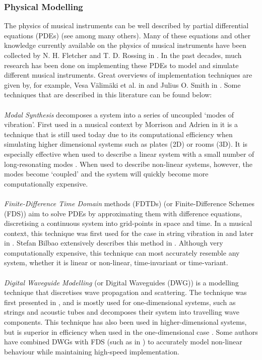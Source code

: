 \subsubsection*{Physical Modelling}
The physics of musical instruments can be well described by partial differential equations (PDEs) (see \cite{Bilbao2009} among many others). Many of these equations and other knowledge currently available on the physics of musical instruments have been collected by N. H. Fletcher and T. D. Rossing in \cite{Fletcher1998}. In the past decades, much research has been done on implementing these PDEs to model and simulate different musical instruments. Great overviews of implementation techniques are given by, for example, Vesa Välimäki et al. in \cite{Valimaki2006} and Julius O. Smith in \cite{Smith2010a, Smith2010b}. Some techniques that are described in this literature can be found below:
\\
\\
\emph{Modal Synthesis} decomposes a system into a series of uncoupled ‘modes of vibration’. First used in a musical context by Morrison and Adrien in \cite{Morrison1993} it is a technique that is still used today due to its computational efficiency when simulating higher dimensional systems such as plates (2D) or rooms (3D). It is especially effective when used to describe a linear system \cite{Bilbao2018} with a small number of long-resonating modes \cite{Smith2010a}. When used to describe non-linear systems, however, the modes become `coupled’ and the system will quickly become more computationally expensive. 
\\
\\
\emph{Finite-Difference Time Domain} methods (FDTDs) (or Finite-Difference Schemes (FDS)) aim to solve PDEs by approximating them with difference equations, discretising a continuous system into grid-points in space and time. In a musical context, this technique was first used for the case in string vibration in \cite{Ruiz1969, Hiller1971I, Hiller1971II} and later in \cite{Chaigne1992, Chaigne1994}. Stefan Bilbao extensively describes this method in \cite{Bilbao2009, Bilbao2018}. Although very computationally expensive, this technique can most accurately resemble any system, whether it is linear or non-linear, time-invariant or time-variant.
\\
\\
\emph{Digital Waveguide Modelling} (or Digital Waveguides (DWG)) is a modelling technique that discretises wave propagation and scattering. The technique was first presented in \cite{Smith1992}, and is mostly used for one-dimensional systems, such as strings and acoustic tubes and decomposes their system into travelling wave components. This technique has also been used in higher-dimensional systems, but is superior in efficiency when used in the one-dimensional case \cite{Valimaki2006}. Some authors have combined DWGs with FDS (such as in \cite{Erkut2002, Maestre2014}) to accurately model non-linear behaviour while maintaining high-speed implementation.
